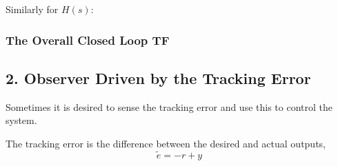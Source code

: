 
\ifslidesonly
\begin{slide}
   
\end{slide}
\fi


\ifslidesonly
\begin{slide}
   
\end{slide}
\fi

Similarly for $H(s)$:

\ifslidesonly
\begin{slide}
   
\end{slide}
\fi




\subsubsection*{The Overall Closed Loop TF} %
\label{ssub:the_overall_closed_loop_tf}


\ifslidesonly
\begin{slide}
   
\end{slide}
\fi


\ifslidesonly
\begin{slide}
   
\end{slide}
\fi


\ifslidesonly
\begin{slide}
   
\end{slide}
\fi






 
\subsection*{2. Observer Driven by the Tracking Error
} %
\label{sub:2_observer_driven_by_the_tracking_error_}

Sometimes it is desired to sense the tracking error and use this to control the system.

The tracking error is the difference between the desired and actual outputs,
\[
\tilde e =  - r + y
\]

